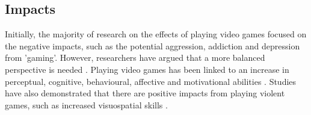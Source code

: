 \documentclass[a4paper,11.5pt]{report}
\numberwithin{figure}{section}
\numberwithin{table}{section}
\numberwithin{equation}{section}
\numberwithin{equation}{section}
\begin{document}






\subsection{Impacts}


Initially, the majority of research on the effects of playing video games focused on the negative impacts, such as the potential aggression, addiction and depression from 'gaming'. However, researchers have argued that a more balanced perspective is needed \citep{Granic2014}. Playing video games has been linked to an increase in perceptual, cognitive, behavioural, affective and motivational abilities \citep{Connolly2012}. Studies have also demonstrated that there are positive impacts from playing violent games, such as increased visuospatial skills \citep{Ferguson2007}. 
\end{document}
